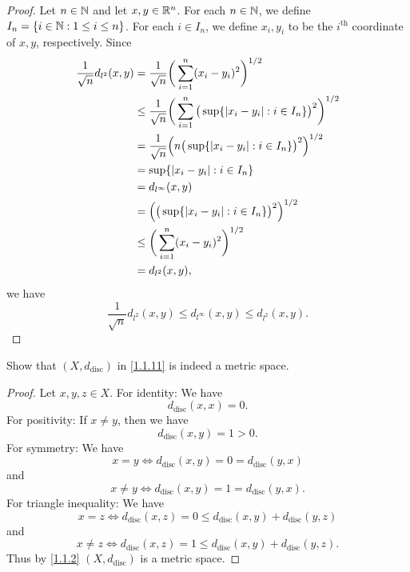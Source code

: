 \begin{proof}
  Let \(n \in \mathbb{N}\) and let \(x, y \in \mathbb{R}^n\).
  For each \(n \in \mathbb{N}\), we define \(I_n = \{i \in \mathbb{N} : 1 \leq i \leq n\}\).
  For each \(i \in I_n\), we define \(x_i, y_i\) to be the \(i^{\text{th}}\) coordinate of \(x, y\), respectively.
  Since
  \begin{align*}
    \dfrac{1}{\sqrt{n}} d_{l^2}(x, y) & = \dfrac{1}{\sqrt{n}} \bigg(\sum_{i = 1}^n (x_i - y_i)^2\bigg)^{1 / 2}                                       \\
                                      & \leq \dfrac{1}{\sqrt{n}} \bigg(\sum_{i = 1}^n \big(\sup \{\left\lvert x_i - y_i\right\rvert : i \in I_n\}\big)^2\bigg)^{1 / 2} \\
                                      & = \dfrac{1}{\sqrt{n}} \Big(n \big(\sup \{\left\lvert x_i - y_i\right\rvert : i \in I_n\}\big)^2\Big)^{1 / 2}                   \\
                                      & = \sup \{\left\lvert x_i - y_i\right\rvert : i \in I_n\}                                                                       \\
                                      & = d_{l^\infty}(x, y)                                                                                         \\
                                      & = \Big(\big(\sup \{\left\lvert x_i - y_i\right\rvert : i \in I_n\}\big)^2\Big)^{1 / 2}                                         \\
                                      & \leq \bigg(\sum_{i = 1}^n (x_i - y_i)^2\bigg)^{1 / 2}                                                        \\
                                      & = d_{l^2}(x, y),
  \end{align*}
  we have
  \[
    \dfrac{1}{\sqrt{n}} d_{l^2}(x, y) \leq d_{l^\infty}(x, y) \leq d_{l^2}(x, y).
  \]
\end{proof}

\begin{ex}\label{ex:1.1.11}
  Show that \((X, d_{\text{disc}})\) in \cref{1.1.11} is indeed a metric space.
\end{ex}

\begin{proof}
  Let \(x, y, z \in X\).
  For identity:
  We have
  \[
    d_{\text{disc}}(x, x) = 0.
  \]
  For positivity:
  If \(x \neq y\), then we have
  \[
    d_{\text{disc}}(x, y) = 1 > 0.
  \]
  For symmetry:
  We have
  \[
    x = y \iff d_{\text{disc}}(x, y) = 0 = d_{\text{disc}}(y, x)
  \]
  and
  \[
    x \neq y \iff d_{\text{disc}}(x, y) = 1 = d_{\text{disc}}(y, x).
  \]
  For triangle inequality:
  We have
  \[
    x = z \iff d_{\text{disc}}(x, z) = 0 \leq d_{\text{disc}}(x, y) + d_{\text{disc}}(y, z)
  \]
  and
  \[
    x \neq z \iff d_{\text{disc}}(x, z) = 1 \leq d_{\text{disc}}(x, y) + d_{\text{disc}}(y, z).
  \]
  Thus by \cref{1.1.2} \((X, d_{\text{disc}})\) is a metric space.
\end{proof}

